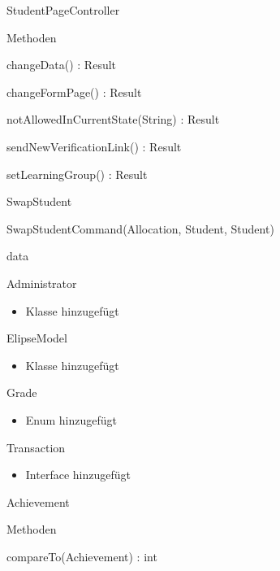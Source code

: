 \documentclass[parskip=full]{scrartcl}
\begin{document}
\begin{itemPackage}
\begin{itemClass}
\begin{itemClassSub}
\begin{itemMinus}
\end{itemMinus}
\end{itemClassSub}
\item StudentPageController
\item \begin{itemClassSub}
\item Methoden
\begin{itemPlus}
\item changeData() : Result
\item changeFormPage() : Result
\item notAllowedInCurrentState(String) : Result
\item sendNewVerificationLink() : Result
\item setLearningGroup() : Result
\end{itemPlus}
\end{itemClassSub}
\item SwapStudent
\begin{itemPlus}
\item SwapStudentCommand(Allocation, Student, Student)
\end{itemPlus}
\end{itemClass}
\item data
\begin{itemClass}
\item Administrator
\begin{itemize}
  \item Klasse hinzugefügt
\end{itemize}
\item ElipseModel
\begin{itemize}
  \item Klasse hinzugefügt
\end{itemize}
\item Grade
\begin{itemize}
  \item Enum hinzugefügt
\end{itemize}
\item Transaction
\begin{itemize}
  \item Interface hinzugefügt
\end{itemize}
\item Achievement
\begin{itemClassSub}
\item Methoden
\begin{itemPlus}
\item compareTo(Achievement) : int
\end{itemPlus}

\end{itemClassSub}
\end{itemClass}
\end{itemPackage}
\end{document}
